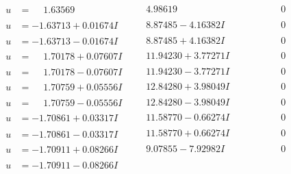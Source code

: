 \documentclass[1p]{elsarticle_modified}
\theoremstyle{definition}
\begin{document}
$$\begin{array}{c|c|c}
 \hline 
\begin{aligned}
u &= \phantom{-}1.63569\phantom{ +0.000000I}\end{aligned}
 & \phantom{-}4.98619\phantom{ +0.000000I} & \phantom{-0.000000 } 0 \\ \hline\begin{aligned}
u &= -1.63713 + 0.01674 I\end{aligned}
 & \phantom{-}8.87485 - 4.16382 I & \phantom{-0.000000 } 0 \\ \hline\begin{aligned}
u &= -1.63713 - 0.01674 I\end{aligned}
 & \phantom{-}8.87485 + 4.16382 I & \phantom{-0.000000 } 0 \\ \hline\begin{aligned}
u &= \phantom{-}1.70178 + 0.07607 I\end{aligned}
 & \phantom{-}11.94230 + 3.77271 I & \phantom{-0.000000 } 0 \\ \hline\begin{aligned}
u &= \phantom{-}1.70178 - 0.07607 I\end{aligned}
 & \phantom{-}11.94230 - 3.77271 I & \phantom{-0.000000 } 0 \\ \hline\begin{aligned}
u &= \phantom{-}1.70759 + 0.05556 I\end{aligned}
 & \phantom{-}12.84280 + 3.98049 I & \phantom{-0.000000 } 0 \\ \hline\begin{aligned}
u &= \phantom{-}1.70759 - 0.05556 I\end{aligned}
 & \phantom{-}12.84280 - 3.98049 I & \phantom{-0.000000 } 0 \\ \hline\begin{aligned}
u &= -1.70861 + 0.03317 I\end{aligned}
 & \phantom{-}11.58770 - 0.66274 I & \phantom{-0.000000 } 0 \\ \hline\begin{aligned}
u &= -1.70861 - 0.03317 I\end{aligned}
 & \phantom{-}11.58770 + 0.66274 I & \phantom{-0.000000 } 0 \\ \hline\begin{aligned}
u &= -1.70911 + 0.08266 I\end{aligned}
 & \phantom{-}9.07855 - 7.92982 I & \phantom{-0.000000 } 0 \\ \hline\begin{aligned}
u &= -1.70911 - 0.08266 I\end{aligned}

\end{array}$$
\end{document}
